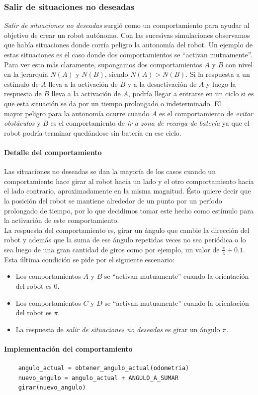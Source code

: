 \subsubsection{Salir de situaciones no deseadas}
\label{out_of_unwanted_situations}
\emph{Salir de situaciones no deseadas} surgi\'o como un comportamiento
para ayudar al objetivo de crear un robot aut\'onomo. Con las sucesivas
simulaciones observamos que hab\'ia situaciones donde corr\'ia
peligro la autonom\'ia del robot. Un ejemplo de estas situaciones es el caso
donde dos comportamientos se ``activan mutuamente''.
\\\indent
Para ver esto m\'as claramente, supongamos dos comportamientos $A$ y $B$ con
nivel en la jerarqu\'ia $N(A)$ y $N(B)$, siendo $N(A) > N(B)$. Si la respuesta
a un est\'imulo de $A$ lleva a la activaci\'on de $B$ y a la desactivaci\'on de
$A$ y luego la respuesta de $B$ lleva a la activaci\'on de $A$, podr\'ia llegar
a entrarse en un ciclo si es que esta situaci\'on se da por un tiempo
prolongado o indeterminado. El\\
mayor peligro para la autonom\'ia ocurre
cuando $A$ es el comportamiento de \emph{evitar obst\'aculos} y $B$ es el
comportamiento de \emph{ir a zona de recarga de bater\'ia} ya que el robot
podr\'ia terminar qued\'andose sin bater\'ia en ese ciclo.

\paragraph{Detalle del comportamiento}
Las situaciones no deseadas se dan la mayor\'ia de los casos cuando un
comportamiento hace girar al robot hacia un lado y el otro comportamiento hacia
el lado contrario, aproximadamente en la misma magnitud. \'Esto quiere decir
que la posici\'on del robot se mantiene alrededor de un punto por un per\'iodo
prolongado de tiempo, por lo que decidimos tomar este hecho como est\'imulo
para la activaci\'on de este comportamiento.
\\\indent
La respuesta del comportamiento es, girar un \'angulo que cambie la
direcci\'on del robot y adem\'as que la suma de ese \'angulo repetidas veces no
sea peri\'odica o lo sea luego de una gran cantidad de giros como por ejemplo,
un valor de $\frac{\pi}{4}+0.1$.
Esta \'ultima condici\'on se pide por el siguiente escenario:
\begin{itemize}
	\item Los comportamientos $A$ y $B$ se ``activan mutuamente'' cuando la
		orientaci\'on del robot es $0$.
	\item Los comportamientos $C$ y $D$ se ``activan mutuamente'' cuando la
		orientaci\'on del robot es $\pi$.
	\item La respuesta de \emph{salir de situaciones no deseadas} es girar un
		\'angulo $\pi$.
\end{itemize}

\paragraph{Implementaci\'on del comportamiento}
\begin{verbatim}
    angulo_actual = obtener_angulo_actual(odometria)
    nuevo_angulo = angulo_actual + ANGULO_A_SUMAR
    girar(nuevo_angulo)
\end{verbatim}

